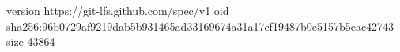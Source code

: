 version https://git-lfs.github.com/spec/v1
oid sha256:96b0729af9219dab5b931465ad33169674a31a17cf19487b0e5157b5eac42743
size 43864

